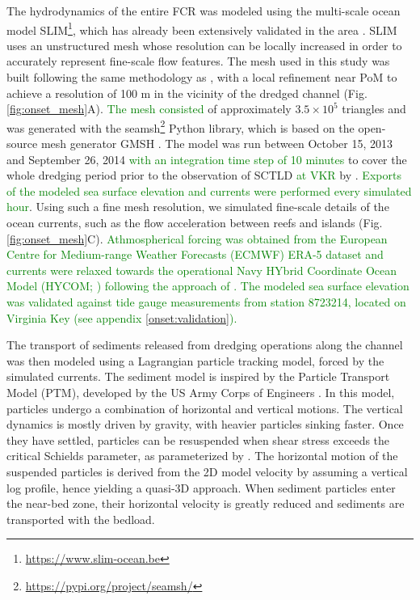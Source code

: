 \documentclass[preprint,12pt,authoryear]{elsarticle}
\newcommand{\modif}[1]{\textcolor{green}{#1}}
\begin{document}
The hydrodynamics of the entire FCR was modeled using the multi-scale ocean model SLIM\footnote{\url{ https://www.slim-ocean.be}}, which has already been extensively validated in the area \citep{frys2020fine,dobbelaere2020coupled,dobbelaere2022impacts,dobbelaere2022connecting}. SLIM uses an unstructured mesh whose resolution can be locally increased in order to accurately represent fine-scale flow features. The mesh used in this study was built following the same methodology as \cite{dobbelaere2020coupled}, with a local refinement near PoM to achieve a resolution of 100 m in the vicinity of the dredged channel (Fig. \ref{fig:onset_mesh}A). \modif{The mesh consisted} of approximately $3.5\times 10^5$ triangles and was generated with the seamsh\footnote{\url{https://pypi.org/project/seamsh/}} Python library, which is based on the open-source mesh generator GMSH \citep{geuzaine2009gmsh}. The model was run between October 15, 2013 and September 26, 2014 \modif{with an integration time step of 10 minutes} to cover the whole dredging period prior to the observation of SCTLD \modif{at VKR} by \cite{precht2016unprecedented}. \modif{Exports of the modeled sea surface elevation and currents were performed every simulated hour}. Using such a fine mesh resolution, we simulated fine-scale details of the ocean currents, such as the flow acceleration between reefs and islands (Fig. \ref{fig:onset_mesh}C). \modif{Athmospherical forcing was obtained from the European Centre for Medium-range Weather Forecasts (ECMWF) ERA-5 dataset and currents were relaxed towards the operational Navy HYbrid Coordinate Ocean Model (HYCOM; \citealp{chassignet2007hycom}) following the approach of \cite{dobbelaere2022impacts}. The modeled sea surface elevation was validated against tide gauge measurements from station 8723214, located on Virginia Key (see appendix \ref{onset:validation}).}

The transport of sediments released from dredging operations along the channel was then modeled using a Lagrangian particle tracking model, forced by the simulated currents. The sediment model is inspired by the Particle Transport Model (PTM), developed by the US Army Corps of Engineers \citep{macdonald2006ptm}. In this model, particles undergo a combination of horizontal and vertical motions. The vertical dynamics is mostly driven by gravity, with heavier particles sinking faster. Once they have settled, particles can be resuspended when shear stress exceeds   the critical Schields parameter, as parameterized by \cite{soulsby1997threshold}. The horizontal motion of the suspended particles is derived from the 2D model velocity by assuming a vertical log profile, hence yielding a quasi-3D approach. When sediment particles enter the near-bed zone, their horizontal velocity is greatly reduced and sediments are transported with the bedload.   
\end{document}
